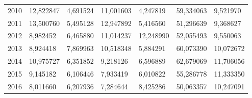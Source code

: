 \begin{table}
\begin{tabular}{p{1cm}p{2cm}p{2cm}p{2cm}p{2cm}p{2cm}p{2cm}}
 2010 &            12,822847 &     4,691524 &                         11,001603 &                          4,247819 &            59,334063 &                      9,521970 \\
 2011 &            13,500760 &     5,495128 &                         12,947892 &                          5,416560 &            51,296639 &                      9,368627 \\
 2012 &             8,982452 &     6,465880 &                         11,014237 &                         12,248990 &            52,055493 &                      9,550063 \\
 2013 &             8,924418 &     7,869963 &                         10,518348 &                          5,884291 &            60,073390 &                     10,072672 \\
 2014 &            10,975727 &     6,351852 &                          9,218126 &                          6,596889 &            62,679069 &                     11,706056 \\
 2015 &             9,145182 &     6,106446 &                          7,933419 &                          6,010822 &            55,286778 &                     11,333350 \\
 2016 &             8,011660 &     6,207936 &                          7,284644 &                          8,425286 &            50,063357 &                     10,247091 \\
\bottomrule
\end{tabular}
\end{table}
